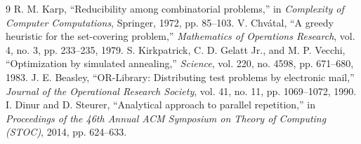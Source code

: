 \documentclass[11pt, a4paper]{article}
\begin{document}
\begin{thebibliography}{9}
 R. M. Karp, ``Reducibility among combinatorial problems,'' in \textit{Complexity of Computer Computations}, Springer, 1972, pp. 85--103.
 V. Chvátal, ``A greedy heuristic for the set-covering problem,'' \textit{Mathematics of Operations Research}, vol. 4, no. 3, pp. 233--235, 1979.
 S. Kirkpatrick, C. D. Gelatt Jr., and M. P. Vecchi, ``Optimization by simulated annealing,'' \textit{Science}, vol. 220, no. 4598, pp. 671--680, 1983.
 J. E. Beasley, ``OR-Library: Distributing test problems by electronic mail,'' \textit{Journal of the Operational Research Society}, vol. 41, no. 11, pp. 1069--1072, 1990.
 I. Dinur and D. Steurer, ``Analytical approach to parallel repetition,'' in \textit{Proceedings of the 46th Annual ACM Symposium on Theory of Computing (STOC)}, 2014, pp. 624--633.
\end{thebibliography}
\end{document}
